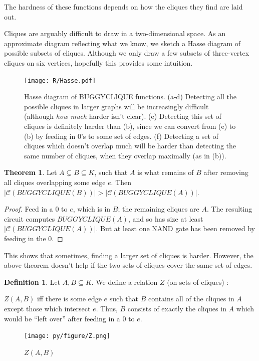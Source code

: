 \documentclass[12pt]{article}
\theoremstyle{definition}
\newtheorem{thm}{Theorem}[section]
\newtheorem{defn}{Definition}[section]
\newcommand{\bigC}[0]{\mathcal{C}}
\begin{document}
The hardness of these functions depends
on how the cliques they find are laid out.

Cliques are arguably difficult to draw in a two-dimensional space.
As an approximate diagram reflecting what we know,
we sketch a Hasse diagram of possible subsets of cliques. Although
we only draw a few subsets of three-vertex cliques
on six vertices, hopefully this provides some
intuition.

\begin{figure}
\centering
\texttt{[image: R/Hasse.pdf]}
\caption{Hasse diagram of BUGGYCLIQUE functions.
(a-d) 
Detecting all the possible cliques in larger graphs will be
increasingly difficult (although {\em how much} harder isn't clear).
(e) 
Detecting this set of cliques is definitely harder than (b),
since we can convert from (e) to (b) by feeding in 0's to
some set of edges.
(f) Detecting a set of cliques which doesn't overlap much will be
harder than detecting the same number of cliques, when they overlap
maximally (as in (b)).}
\label{fig:Hasse}
\end{figure}


\begin{thm}
\label{edgeZonking}
Let $A \subsetneq B \subseteq K$, such that $A$ is what remains
of $B$ after removing all cliques overlapping some edge $e$.
Then $|\bigC(BUGGYCLIQUE(B))| > |\bigC(BUGGYCLIQUE(A))|$.
\end{thm}
\begin{proof}
Feed in a 0 to $e$, which is in $B$; the remaining cliques are $A$.
The resulting
circuit computes $BUGGYCLIQUE(A)$, and so has size
at least $|\bigC(BUGGYCLIQUE(A))|$. But at least one
NAND gate has been removed by feeding in the 0.
\end{proof}

This shows that sometimes, finding a larger set of cliques is
harder. However, the above theorem doesn't help if the two
sets of cliques cover the same set of edges.

\begin{defn}
\label{zRelation}
Let $A, B \subseteq K$. We define a relation $Z$ (on sets of cliques) :

$Z(A,B)$ iff there is some edge $e$ such that $B$ contains all of the
cliques in $A$ except those which intersect $e$. Thus, $B$ consists
of exactly the cliques in $A$ which would be ``left over'' after
feeding in a 0 to $e$.
\end{defn}

\begin{figure}
\label{Z}
\centering
\texttt{[image: py/figure/Z.png]}
\caption{$Z(A,B)$}
\label{fig:Z}
\end{figure}
\end{document}
